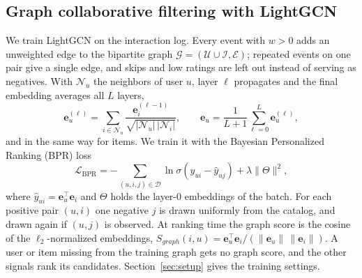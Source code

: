 \documentclass[3p,times,procedia]{elsarticle}
\begin{document}
\subsection{Graph collaborative filtering with LightGCN}
\label{sec:lightgcn}
We train LightGCN \cite{he2020lightgcn} on the interaction log. Every event with $w>0$ adds an unweighted edge to the bipartite graph $\mathcal{G}=(\mathcal{U}\cup\mathcal{I},\mathcal{E})$; repeated events on one pair give a single edge, and skips and low ratings are left out instead of serving as negatives. With $\mathcal{N}_u$ the neighbors of user $u$, layer $\ell$ propagates and the final embedding averages all $L$ layers,
\begin{equation}
    \mathbf{e}^{(\ell)}_u=\sum_{i\in\mathcal{N}_u}\frac{\mathbf{e}^{(\ell-1)}_i}{\sqrt{|\mathcal{N}_u|\,|\mathcal{N}_i|}},
    \qquad
    \mathbf{e}_u=\frac{1}{L+1}\sum_{\ell=0}^{L}\mathbf{e}^{(\ell)}_u,
    \label{eq:lightgcn}
\end{equation}
and in the same way for items. We train it with the Bayesian Personalized Ranking (BPR) loss
\begin{equation}
    \mathcal{L}_{\mathrm{BPR}}=
    -\sum_{(u,i,j)\in\mathcal{D}}\ln\sigma(\hat{y}_{ui}-\hat{y}_{uj})
    +\lambda\|\Theta\|^2,
    \label{eq:bpr}
\end{equation}
where $\hat{y}_{ui}=\mathbf{e}_u^\top\mathbf{e}_i$ and $\Theta$ holds the layer-0 embeddings of the batch. For each positive pair $(u,i)$ one negative $j$ is drawn uniformly from the catalog, and drawn again if $(u,j)$ is observed. At ranking time the graph score is the cosine of the $\ell_2$-normalized embeddings, $S_{\mathit{graph}}(i,u)=\mathbf{e}_u^\top\mathbf{e}_i/(\|\mathbf{e}_u\|\,\|\mathbf{e}_i\|)$. A user or item missing from the training graph gets no graph score, and the other signals rank its candidates. Section~\ref{sec:setup} gives the training settings.
\end{document}
